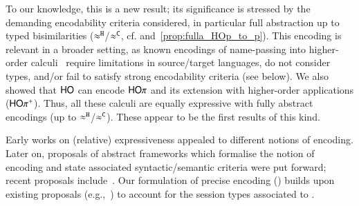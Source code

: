 \documentclass[preprint,11pt]{elsarticle}
\begin{document}
{To our knowledge, this is a new result; %
its significance is stressed by the demanding encodability criteria  considered, in particular full abstraction up to typed bisimilarities
($\approx^\mathtt{H}$/$\approx^\mathtt{C}$, cf.  and~\ref{prop:fulla_HOp_to_p}).
This encoding is relevant in a broader setting, as known encodings 
of name-passing into higher-order calculi~\cite{SaWabook,BundgaardHG06,DBLP:journals/entcs/MeredithR05,XuActa2012,DBLP:journals/corr/XuYL15}  require limitations
in source/target languages,
do not consider types,
 and/or fail to satisfy strong encodability criteria (see below). 
We also showed that $\mathsf{HO}$ can encode $\mathsf{HO}\pi$ and its extension with
higher-order applications ($\mathsf{HO\pi^{+}}$). 
Thus, %
all these  calculi are equally expressive with fully
abstract encodings (up to $\approx^\mathtt{H}$/$\approx^\mathtt{C}$).  
These appear to be the first results of this kind.

Early works on (relative) expressiveness appealed to different notions of encoding.
Later on, 
proposals of abstract 
frameworks which formalise the notion of encoding 
and state associated syntactic/semantic criteria 
were put forward; 
recent proposals include~\cite{DBLP:journals/iandc/Gorla10,DBLP:journals/tcs/FuL10,DBLP:journals/corr/abs-1208-2750,DBLP:conf/esop/PetersNG13,DBLP:journals/corr/PetersG15}. 
Our formulation of precise encoding () 
builds upon existing proposals (e.g.,~\cite{Palamidessi03,DBLP:journals/iandc/Gorla10,DBLP:conf/icalp/LanesePSS10})
 to account for the session types
associated to \HOp. %


}
\end{document}
